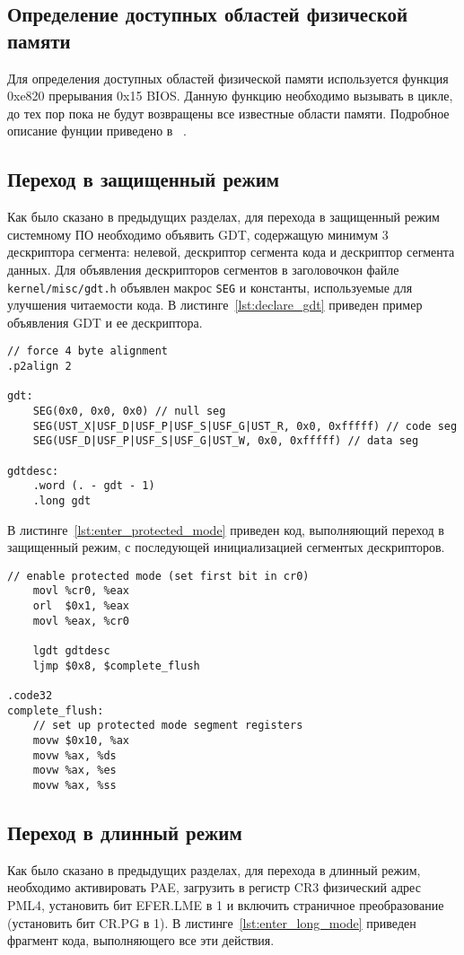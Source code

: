 \subsection{Определение доступных областей физической памяти}
Для определения доступных областей физической памяти используется функция 0xe820 прерывания 0x15 BIOS.
Данную функцию необходимо вызывать в цикле, до тех пор пока не будут возвращены все известные области
памяти. Подробное описание фунции приведено в ~\cite{detect_memory_bios}.

\subsection{Переход в защищенный режим}
Как было сказано в предыдущих разделах, для перехода в защищенный режим системному ПО
необходимо объявить GDT, содержащую минимум 3 дескриптора сегмента: нелевой, дескриптор сегмента
кода и дескриптор сегмента данных. Для объявления дескрипторов сегментов в заголовочкон файле
\texttt{kernel/misc/gdt.h} объявлен макрос \texttt{SEG} и константы, используемые для улучшения
читаемости кода. В листинге~\ref{lst:declare_gdt} приведен пример объявления GDT и ее дескриптора.

\begin{lstlisting}[language={[x86masm]Assembler},
caption={Объявление GDT и ее дескриптора},label={lst:declare_gdt}]
// force 4 byte alignment
.p2align 2

gdt:
	SEG(0x0, 0x0, 0x0) // null seg
	SEG(UST_X|USF_D|USF_P|USF_S|USF_G|UST_R, 0x0, 0xfffff) // code seg
	SEG(USF_D|USF_P|USF_S|USF_G|UST_W, 0x0, 0xfffff) // data seg

gdtdesc:
	.word (. - gdt - 1)
	.long gdt
\end{lstlisting}

В листинге~\ref{lst:enter_protected_mode} приведен код, выполняющий переход в защищенный режим,
с последующей инициализацией сегментых дескрипторов.
\begin{lstlisting}[language={[x86masm]Assembler},
caption={Переход в защищенный режим},label={lst:enter_protected_mode}]
	// enable protected mode (set first bit in cr0)
	movl %cr0, %eax
	orl  $0x1, %eax
	movl %eax, %cr0

	lgdt gdtdesc
	ljmp $0x8, $complete_flush

.code32
complete_flush:
	// set up protected mode segment registers
	movw $0x10, %ax
	movw %ax, %ds
	movw %ax, %es
	movw %ax, %ss
\end{lstlisting}

\subsection{Переход в длинный режим}
Как было сказано в предыдущих разделах, для перехода в длинный режим, необходимо
активировать PAE, загрузить в регистр CR3 физический адрес PML4, установить бит
EFER.LME в 1 и включить страничное преобразование (установить бит CR.PG в 1). В
листинге~\ref{lst:enter_long_mode} приведен фрагмент кода, выполняющего все эти действия.

